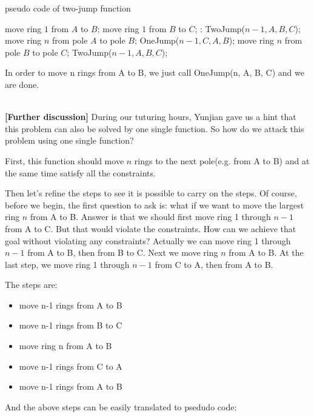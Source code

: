 \documentclass[a4paper,11pt]{article}
\theoremstyle{mytheor}
\begin{document}
\begin{algorithm}[H]
\caption{pseudo code of two-jump function}\label{TwoJump}
\begin{algorithmic}[1]
 
    \State move ring $1$ from $A$ to $B$;
    \State move ring $1$ from $B$ to $C$;
  \Else:
    \State TwoJump($n-1, A, B, C$);
    \State move ring $n$ from pole $A$ to pole $B$;
    \State OneJump($n-1, C, A, B$);
    \State move ring $n$ from pole $B$ to pole $C$;
    \State TwoJump($n-1, A, B, C$);
  \EndIf
\EndProcedure
\end{algorithmic}
\end{algorithm}
In order to move n rings from A to B, we just call OneJump(n, A, B, C) and we are done.

~\\

\textbf{[Further discussion]}
During our tuturing hours, Yunjian gave us a hint that this problem can also be solved by one single function. So how do we attack this problem using one single function?


First, this function should move $n$ rings to the next pole(e.g. from A to B) and at the same time satisfy all the constraints. 

Then let's refine the steps to see it is possible to carry on the steps. Of course, before we begin, the first question to ask is: what if we want to move the largest ring $n$ from A to B. Answer is that we should first move ring 1 through $n-1$ from A to C. But that would violate the constraints. How can we achieve that goal without violating any constraints? Actually we can move ring 1 through $n-1$ from A to B, then from B to C. Next we move ring $n$ from A to B. At the last step, we move ring 1 through $n-1$ from C to A, then from A to B.

The steps are:
\begin{itemize}
    \item move n-1 rings from A to B
    \item move n-1 rings from B to C
    \item move ring n from A to B
    \item move n-1 rings from C to A
    \item move n-1 rings from A to B
\end{itemize}
And the above steps can be easily translated to psedudo code:
\iffalse
\begin{lstlisting}[label={list:eighth1},caption=pseudo code of Circular Tower of Hanoi function.]
procedure CTH(n, A, B, C);
  if n == 1:
    move ring 1 from A to B;
  else:
    CTH(n-1, A, B, C);
    CTH(n-1, B, C, A);
    move ring n from A to B;
    CTH(n-1, C, A, B);
    CTH(n-1, A, B, C);
\end{lstlisting}
\fi
\end{document}
